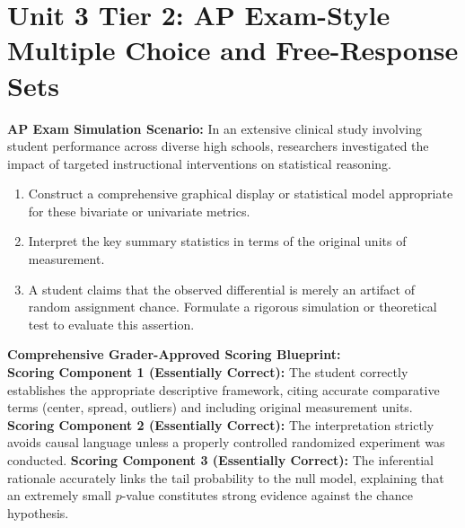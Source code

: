 \section{Unit 3 Tier 2: AP Exam-Style Multiple Choice and Free-Response Sets}
\begin{workbookbox}
\textbf{AP Exam Simulation Scenario:} In an extensive clinical study involving student performance across diverse high schools, researchers investigated the impact of targeted instructional interventions on statistical reasoning.
\begin{enumerate}[label=(\alph*)]
  \item Construct a comprehensive graphical display or statistical model appropriate for these bivariate or univariate metrics.
  \item Interpret the key summary statistics in terms of the original units of measurement.
  \item A student claims that the observed differential is merely an artifact of random assignment chance. Formulate a rigorous simulation or theoretical test to evaluate this assertion.
\end{enumerate}
\textbf{Comprehensive Grader-Approved Scoring Blueprint:}\\
\textbf{Scoring Component 1 (Essentially Correct):} The student correctly establishes the appropriate descriptive framework, citing accurate comparative terms (center, spread, outliers) and including original measurement units.
\textbf{Scoring Component 2 (Essentially Correct):} The interpretation strictly avoids causal language unless a properly controlled randomized experiment was conducted.
\textbf{Scoring Component 3 (Essentially Correct):} The inferential rationale accurately links the tail probability to the null model, explaining that an extremely small $p$-value constitutes strong evidence against the chance hypothesis.
\end{workbookbox}\vspace{6pt}

